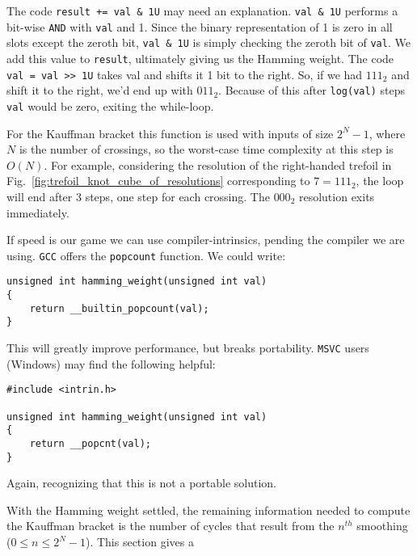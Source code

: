         The code \texttt{result += val \& 1U} may need an explanation.
        \texttt{val \& 1U} performs a bit-wise \texttt{AND} with \texttt{val} and
        1. Since the binary representation of 1 is zero in all slots except the
        zeroth bit, \texttt{val \& 1U} is simply checking the zeroth bit of
        \texttt{val}. We add this value to \texttt{result}, ultimately giving
        us the Hamming weight. The code \texttt{val = val >> 1U} takes val and
        shifts it 1 bit to the right. So, if we had $111_{2}$ and shift it to
        the right, we'd end up with $011_{2}$. Because of this after
        \texttt{log(val)} steps \texttt{val} would be zero, exiting the
        while-loop.
        \par\hfill\par
        For the Kauffman bracket this function is used with inputs of size
        $2^{N}-1$, where $N$ is the number of crossings, so the worst-case
        time complexity at this step is $O(N)$. For example, considering the
        resolution of the right-handed trefoil
        in Fig.~\ref{fig:trefoil_knot_cube_of_resolutions} corresponding to
        $7=111_{2}$, the loop will end after 3 steps, one step for each
        crossing. The $000_{2}$ resolution exits immediately.
        \par\hfill\par
        If speed is our game we can use compiler-intrinsics, pending the
        compiler we are using. \texttt{GCC} offers the \texttt{popcount}
        function. We could write:
\begin{lstlisting}[style=CStyle]
unsigned int hamming_weight(unsigned int val)
{
    return __builtin_popcount(val);
}
\end{lstlisting}
        This will greatly improve performance, but breaks portability.
        \texttt{MSVC} users (Windows) may find the following helpful:
\begin{lstlisting}[style=CStyle]
#include <intrin.h>

unsigned int hamming_weight(unsigned int val)
{
    return __popcnt(val);
}
\end{lstlisting}
        Again, recognizing that this is not a portable solution.
        \par\hfill\par
        With the Hamming weight settled, the remaining information needed to
        compute the Kauffman bracket is the number of cycles that result from
        the $n^{th}$ smoothing ($0\leq{n}\leq{2}^{N}-1$). This section gives a
